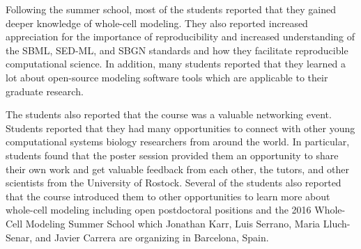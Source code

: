 \documentclass[journal,transmag]{IEEEtran}
\begin{document}
Following the summer school, most of the students reported that they gained deeper knowledge of whole-cell modeling. 
They also reported increased appreciation for the importance of reproducibility and increased understanding of the SBML, SED-ML, and SBGN standards and how they facilitate reproducible computational science.
In addition, many students reported that they learned a lot about open-source modeling software tools which are applicable to their graduate research.

The students also reported that the course was a valuable networking event. 
Students reported that they had many opportunities to connect with other young computational systems biology researchers from around the world.
In particular, students found that the poster session provided them an opportunity to share their own work and get valuable feedback from each other, the tutors, and other scientists from the University of Rostock.
Several of the students also reported that the course introduced them to other opportunities to learn more about whole-cell modeling including open postdoctoral positions and the 2016 Whole-Cell Modeling Summer School which Jonathan Karr, Luis Serrano, Maria Lluch-Senar, and Javier Carrera are organizing in Barcelona, Spain.


\end{document}
